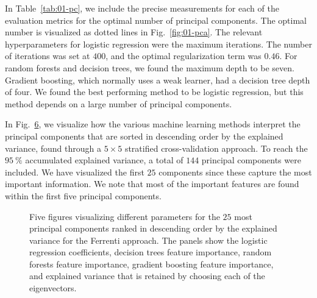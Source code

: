 \documentclass[superscriptaddress,unsortedaddress,
 amsmath,amssymb,
 aps,
]{revtex4-2}
\begin{document}
In Table~\ref{tab:01-pc}, we include the precise measurements for each of the evaluation metrics for the optimal number of principal components. The optimal number is visualized as dotted lines in Fig.~\ref{fig:01-pca}. The relevant hyperparameters for logistic regression were the maximum iterations. The number of iterations was set at $400$, and the optimal regularization term was $0.46$. For random forests and decision trees, we found the maximum depth to be seven. Gradient boosting, which normally uses a weak learner, had a decision tree depth of four. We found the best performing method to be logistic regression, but this method depends on a large number of principal components. 

In Fig.~\ref{fig:01-fi}, we visualize how the various machine learning methods  interpret the principal components that are sorted in descending order by the explained variance, found through a $5\times 5$ stratified cross-validation approach. To reach the $95 \ \%$ accumulated explained variance, a total of $144$ principal components were included. We have visualized the first $25$ components since these capture the most important information. We note that most of the important features are found within the first five principal components.

\begin{figure}[ht!]
  \begin{subfigure}[b]{0.5\textwidth}
    \centering
    
    \label{fig:01-fi-a}
  \end{subfigure}%

  \begin{subfigure}[b]{0.5\textwidth}
    \centering
    
    \label{fig:01-fi-b}
  \end{subfigure}%

  \begin{subfigure}[b]{0.5\textwidth}
    \centering
    
    \label{fig:01-fi-c}
  \end{subfigure}%

  \begin{subfigure}[b]{0.5\textwidth}
    \centering
    
    \label{fig:01-fi-d}
  \end{subfigure}%

  \begin{subfigure}[b]{0.5\textwidth}
    \centering
    
    \label{fig:01-fi-e}
  \end{subfigure}%

  \caption{Five figures visualizing different parameters for the $25$ most principal components ranked in descending order by the explained variance for the Ferrenti approach. The panels show the logistic regression coefficients, decision trees feature importance, random forests feature importance, gradient boosting feature importance, and explained variance that is retained by choosing each of the eigenvectors. }
  \label{fig:01-fi}
\end{figure}
\end{document}
